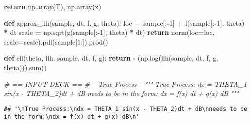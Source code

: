 \documentclass[]{article}
\newenvironment{Shaded}{\begin{snugshade}}{\end{snugshade}}
\newcommand{\BuiltInTok}[1]{#1}
\newcommand{\CommentTok}[1]{\textcolor[rgb]{0.56,0.35,0.01}{\textit{#1}}}
\newcommand{\ControlFlowTok}[1]{\textcolor[rgb]{0.13,0.29,0.53}{\textbf{#1}}}
\newcommand{\DecValTok}[1]{\textcolor[rgb]{0.00,0.00,0.81}{#1}}
\newcommand{\KeywordTok}[1]{\textcolor[rgb]{0.13,0.29,0.53}{\textbf{#1}}}
\newcommand{\NormalTok}[1]{#1}
\newcommand{\OperatorTok}[1]{\textcolor[rgb]{0.81,0.36,0.00}{\textbf{#1}}}
\begin{document}
\begin{Shaded}
\begin{Highlighting}[]
    \ControlFlowTok{return}\NormalTok{ np.array(T), np.array(x)}


\KeywordTok{def}\NormalTok{ approx_llh(sample, dt, f, g, theta):}
\NormalTok{    loc }\OperatorTok{=}\NormalTok{ sample[:}\OperatorTok{-}\DecValTok{1}\NormalTok{] }\OperatorTok{+}\NormalTok{ f(sample[:}\OperatorTok{-}\DecValTok{1}\NormalTok{], theta) }\OperatorTok{*}\NormalTok{ dt}
\NormalTok{    scale }\OperatorTok{=}\NormalTok{ np.sqrt(g(sample[:}\OperatorTok{-}\DecValTok{1}\NormalTok{], theta) }\OperatorTok{*}\NormalTok{ dt)}
    \ControlFlowTok{return}\NormalTok{ norm(loc}\OperatorTok{=}\NormalTok{loc, scale}\OperatorTok{=}\NormalTok{scale).pdf(sample[}\DecValTok{1}\NormalTok{:]).prod()}


\KeywordTok{def}\NormalTok{ ell(theta, llh, sample, dt, f, g):}
    \ControlFlowTok{return} \OperatorTok{-}\NormalTok{ (np.log(llh(sample, dt, f, g, theta))).}\BuiltInTok{sum}\NormalTok{()}


\CommentTok{# == INPUT DECK ==}
\CommentTok{# -- True Process --}
\CommentTok{"""}
\CommentTok{True Process:}
\CommentTok{dx = THETA_1 sin(x - THETA_2)dt + dB}
\CommentTok{needs to be in the form:}
\CommentTok{dx = f(x) dt + g(x) dB}
\CommentTok{"""}
\end{Highlighting}
\end{Shaded}

\begin{verbatim}
## '\nTrue Process:\ndx = THETA_1 sin(x - THETA_2)dt + dB\nneeds to be in the form:\ndx = f(x) dt + g(x) dB\n'
\end{verbatim}
\end{document}
